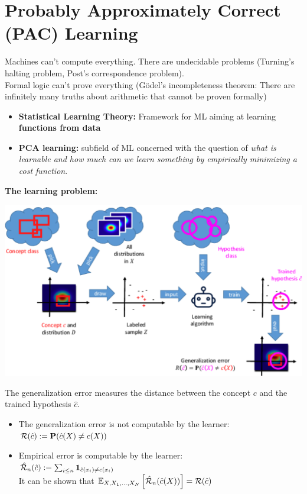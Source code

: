 \section{Probably Approximately Correct (PAC) Learning}
Machines can't compute everything. There are undecidable problems (Turning's halting problem, Post's correspondence problem). \\
Formal logic can't prove everything (G\"{o}del's incompleteness theorem: There are infinitely many truths about arithmetic that cannot be proven formally)
\begin{itemize}
	\item \textbf{Statistical Learning Theory: } Framework for ML aiming at learning \textbf{functions from data}
	\item \textbf{PCA learning: } subfield of ML concerned with the question of \textit{what is learnable and how much can we learn something by empirically minimizing a cost function}.
\end{itemize}

\begin{minipage}{\columnwidth}
\textbf{The learning problem:}
\begin{center}
	\includegraphics[width=\columnwidth]{images/13-learning-problem}
\end{center}
\end{minipage}
The generalization error measures the distance between the concept $c$ and the trained hypothesis $\hat c$.
\begin{itemize}
	\item The generalization error is not computable by the learner: \\ $\mathcal R(\hat c) := \P(\hat c(X) \neq c(X))$
	\item Empirical error is computable by the learner: \\
	$ \hat{\mathcal R}_n(\hat c) := \sumin \mathbf 1_{\hat c(x_i)\neq c(x_i)}$ \\
	It can be shown that $\E_{X, X_1, ..., X_N}\left[\hat{\mathcal R}_n(\hat c(X))\right] = \mathcal R(\hat c)$
\end{itemize}

